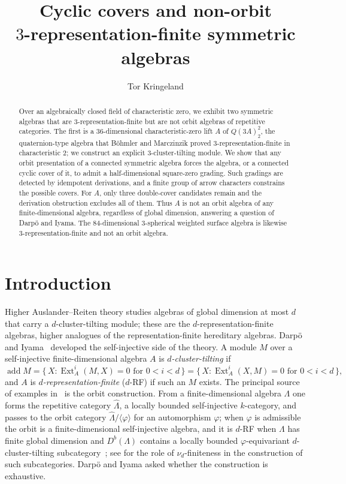 \documentclass[11pt]{amsart}
\title[Cyclic covers and non-orbit $3$-representation-finite algebras]
{Cyclic covers and non-orbit\\ $3$-representation-finite symmetric algebras}
\author{Tor Kringeland}
\date{}
\theoremstyle{plain}
\theoremstyle{definition}
\DeclareMathOperator{\Ext}{Ext}
\DeclareMathOperator{\add}{add}
\newcommand{\rep}{\widehat{\Lambda}}
\begin{document}
\begin{abstract}
Over an algebraically closed field of characteristic zero, we exhibit two symmetric algebras that are
$3$-representation-finite but are not orbit algebras of repetitive categories. The first is a $36$-dimensional
characteristic-zero lift $A$ of $Q(3A)^2_2$, the quaternion-type algebra that Böhmler and Marczinzik proved
$3$-representation-finite in characteristic $2$; we construct an explicit $3$-cluster-tilting module. We show
that any orbit presentation of a connected symmetric algebra forces the algebra, or a connected cyclic cover
of it, to admit a half-dimensional square-zero grading. Such gradings are detected by idempotent derivations,
and a finite group of arrow characters constrains the possible covers. For $A$, only three double-cover
candidates remain and the derivation obstruction excludes all of them. Thus $A$ is not an orbit algebra of any
finite-dimensional algebra, regardless of global dimension, answering a question of Darpö and Iyama. The
$84$-dimensional $3$-spherical weighted surface algebra is likewise $3$-representation-finite and not an orbit
algebra.
\end{abstract}

\maketitle

\section{Introduction}

Higher Auslander--Reiten theory studies algebras of global dimension at most $d$ that carry a
$d$-cluster-tilting module; these are the $d$-representation-finite algebras, higher analogues of the
representation-finite hereditary algebras. Darpö and Iyama~\cite{DI} developed the self-injective side of the
theory. A module $M$ over a self-injective finite-dimensional algebra $A$ is \emph{$d$-cluster-tilting} if
\[
  \add M = \{\, X : \Ext^i_A(M,X)=0 \text{ for } 0<i<d \,\}
         = \{\, X : \Ext^i_A(X,M)=0 \text{ for } 0<i<d \,\},
\]
and $A$ is \emph{$d$-representation-finite} ($d$-RF) if such an $M$ exists. The principal source of examples
in~\cite{DI} is the orbit construction. From a finite-dimensional algebra $\Lambda$ one forms the repetitive
category $\rep$, a locally bounded self-injective $k$-category, and passes to the orbit category
$\rep/\langle\varphi\rangle$ for an automorphism $\varphi$; when $\varphi$ is admissible the orbit is a
finite-dimensional self-injective algebra, and it is $d$-RF when $\Lambda$ has finite global dimension and
$D^b(\Lambda)$ contains a locally bounded $\varphi$-equivariant $d$-cluster-tilting
subcategory~\cite[Theorem~2.3]{DI}; see \cite[\S2]{DI} for the role of $\nu_d$-finiteness in the construction
of such subcategories. Darpö and Iyama asked whether the construction is exhaustive.
\end{document}
